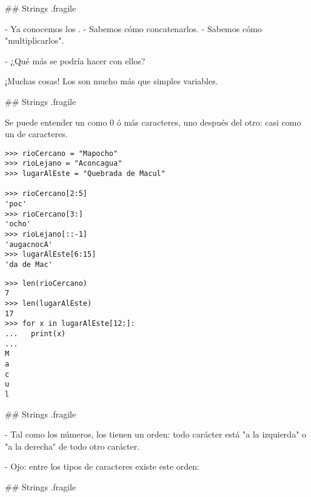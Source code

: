 ## Strings {.fragile}

- Ya conocemos los .
    - Sabemos cómo concatenarlos.
    - Sabemos cómo "multiplicarlos".


- ¿Qué más se podría hacer con ellos?

\bgnblockidea
¡Muchas cosas! Los  son mucho más que simples variables.
\trmblockidea

## Strings {.fragile}

\bgnblockdefinition
Se puede entender un  como 0 ó más caracteres, uno después del otro: casi
como un  de caracteres.
\trmblockdefinition


\bgncolumns[-2ex]

\begin{lstlisting}[style=frame03]
>>> rioCercano = "Mapocho"
>>> rioLejano = "Aconcagua"
>>> lugarAlEste = "Quebrada de Macul"

>>> rioCercano[2:5]
'poc'
>>> rioCercano[3:]
'ocho'
>>> rioLejano[::-1]
'augacnocA'
>>> lugarAlEste[6:15]
'da de Mac'
\end{lstlisting}


\begin{lstlisting}[style=frame03]
>>> len(rioCercano)
7
>>> len(lugarAlEste)
17
>>> for x in lugarAlEste[12:]:
...   print(x)
... 
M
a
c
u
l
\end{lstlisting}

\trmcolumns

## Strings {.fragile}



- Tal como los números, los  tienen un orden: todo carácter está "a la izquierda"
o "a la derecha" de todo otro carácter.

- Ojo: entre los tipos de caracteres existe este orden:

\bgnblockdefinition
{}
\trmblockdefinition


## Strings {.fragile}

